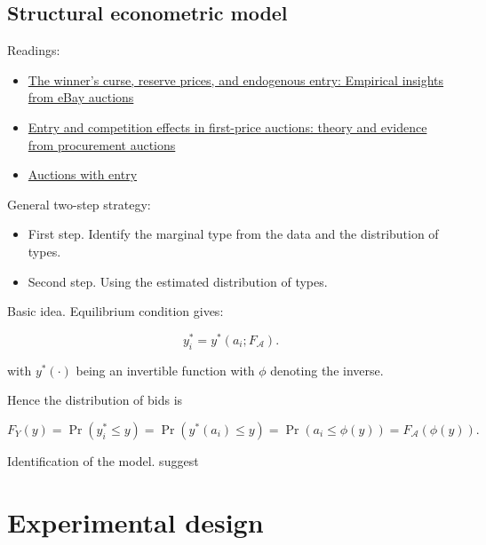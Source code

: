 \documentclass[10pt, titlepage]{article}
\begin{document}
\subsection{Structural econometric
model}\label{structural-econometric-model}

Readings:

\begin{itemize}
\item
  \href{http://citeseerx.ist.psu.edu/viewdoc/download?doi=10.1.1.199.680\&rep=rep1\&type=pdf}{The
  winner's curse, reserve prices, and endogenous entry: Empirical
  insights from eBay auctions}
\item
  \href{https://www.econstor.eu/bitstream/10419/79263/1/516364804.pdf}{Entry
  and competition effects in first-price auctions: theory and evidence
  from procurement auctions}
\item
  \href{http://www.vita.mcafee.cc/PDF/AuctionswithEntry.pdf}{Auctions
  with entry}
\end{itemize}

General two-step strategy:

\begin{itemize}
\item
  First step. Identify the marginal type from the data and the
  distribution of types.
\item
  Second step. Using the estimated distribution of types.
\end{itemize}

Basic idea. Equilibrium condition gives:

\begin{equation}
  y_i^* = y^*(a_i; F_{\mathcal{A}}). 
\end{equation}

with \(y^*(\cdot)\) being an invertible function with \(\phi\) denoting
the inverse.

Hence the distribution of bids is

\begin{equation}
F_{Y}(y) = \Pr(y_i^* \leq y) 
        = \Pr(y^*(a_i) \leq y) 
        = \Pr(a_i \leq \phi(y)) 
        = F_\mathcal{A}( \phi(y)).
\end{equation}

Identification of the model. suggest

\section{Experimental design}\label{experimental-design}
\end{document}
